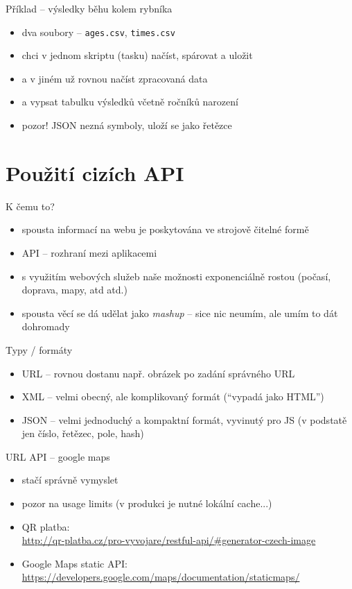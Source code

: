 \documentclass{beamer}
\begin{document}
\begin{frame}{Příklad -- výsledky běhu kolem rybníka}
  \begin{itemize}
    \item dva soubory -- \texttt{ages.csv}, \texttt{times.csv}
    \item chci v jednom skriptu (tasku) načíst, spárovat a uložit
    \item a v jiném už rovnou načíst zpracovaná data
    \item a vypsat tabulku výsledků včetně ročníků narození
    \item pozor! JSON nezná symboly, uloží se jako řetězce
  \end{itemize}
\end{frame}

\section{Použití cizích API}

\begin{frame}{K čemu to?}
  \begin{itemize}
    \item spousta informací na webu je poskytována ve strojově čitelné formě
    \item API -- rozhraní mezi aplikacemi
    \item s využitím webových služeb naše možnosti exponenciálně rostou (počasí, doprava, mapy, atd atd.)
    \item spousta věcí se dá udělat jako \emph{mashup} -- sice nic neumím, ale umím to dát dohromady
  \end{itemize}
\end{frame}


\begin{frame}{Typy / formáty}
  \begin{itemize}
    \item URL -- rovnou dostanu např. obrázek po zadání správného URL
    \item XML -- velmi obecný, ale komplikovaný formát (``vypadá jako HTML'')
    \item JSON -- velmi jednoduchý a kompaktní formát, vyvinutý pro JS (v podstatě jen číslo, řetězec, pole, hash)
  \end{itemize}
\end{frame}


\begin{frame}{URL API -- google maps}
  \begin{itemize}
    \item stačí správně vymyslet
    \item pozor na usage limits (v produkci je nutné lokální cache...)
    \item QR platba: \\
    {\tiny \url{http://qr-platba.cz/pro-vyvojare/restful-api/\#generator-czech-image}}
    \item Google Maps static API: \\
    {\tiny \url{https://developers.google.com/maps/documentation/staticmaps/}}
  \end{itemize}
\end{frame}
\end{document}
